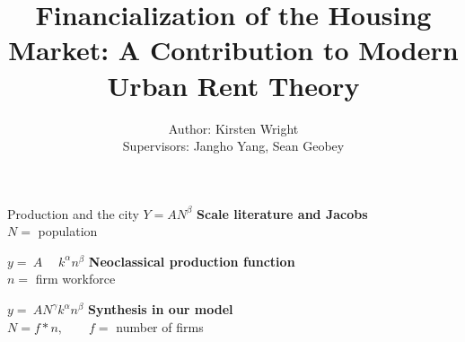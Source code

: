 \documentclass[notes=show]{beamer} %
\title{ Financialization of the Housing Market: A Contribution to Modern Urban Rent Theory}
\author{
  Author: Kirsten Wright \\
  Supervisors: Jangho Yang, Sean Geobey
}
\institute{PhD Thesis Defense \\[1ex] University of Waterloo}
\begin{document}

{
    \maketitle   
}

\begin{frame}
\begin{figure}[!ht]
\centering
\resizebox{0.85\textwidth}{!}{}
% 
\label{fig-fields}
\end{figure}
\end{frame}

\begin{frame}{Production and the city}
\huge 
$Y=AN^\beta$ {\normalsize \hfill \textbf{Scale literature and Jacobs}\\\hfill $N =$ population}
\vspace{.5cm}

$y=\:A\quad \;k^\alpha n^\beta$ {\normalsize \hfill \textbf{Neoclassical production function}\\ \hfill$n =$ firm workforce}
\vspace{.5cm}

$y=\:AN^\gamma k^\alpha n^\beta$ {\normalsize \hfill \textbf{Synthesis in our model}\\\hfill $N = f*n, \qquad f=$ number of firms}



\end{frame}
\end{document}

